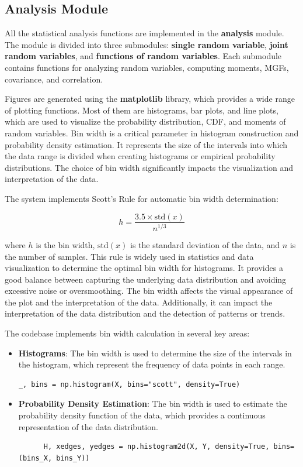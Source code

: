 \documentclass{article}
\begin{document}
\subsection{Analysis Module}

All the statistical analysis functions are implemented in the \textbf{analysis} module. The module is divided into three submodules: \textbf{single random variable}, \textbf{joint random variables}, and \textbf{functions of random variables}. Each submodule contains functions for analyzing random variables, computing moments, MGFs, covariance, and correlation.

Figures are generated using the \textbf{matplotlib} library, which provides a wide range of plotting functions. Most of them are histograms, bar plots, and line plots, which are used to visualize the probability distribution, CDF, and moments of random variables. Bin width is a critical parameter in histogram construction and probability density estimation. It represents the size of the intervals into which the data range is divided when creating histograms or empirical probability distributions. The choice of bin width significantly impacts the visualization and interpretation of the data.

The system implements Scott's Rule for automatic bin width determination:

\begin{equation}
  h = \frac{3.5 \times \text{std}(x)}{n^{1/3}}
\end{equation}

where $h$ is the bin width, $\text{std}(x)$ is the standard deviation of the data, and $n$ is the number of samples. This rule is widely used in statistics and data visualization to determine the optimal bin width for histograms. It provides a good balance between capturing the underlying data distribution and avoiding excessive noise or oversmoothing. The bin width  affects the visual appearance of the plot and the interpretation of the data. Additionally, it can impact the interpretation of the data distribution and the detection of patterns or trends.

The codebase implements bin width calculation in several key areas:

\begin{itemize}
  \item \textbf{Histograms}: The bin width is used to determine the size of the intervals in the histogram, which represent the frequency of data points in each range.
    \begin{verbatim}
_, bins = np.histogram(X, bins="scott", density=True)
    \end{verbatim}
  \item \textbf{Probability Density Estimation}: The bin width is used to estimate the probability density function of the data, which provides a continuous representation of the data distribution.
    \begin{verbatim}
      H, xedges, yedges = np.histogram2d(X, Y, density=True, bins=(bins_X, bins_Y))
    \end{verbatim}
\end{itemize}
\end{document}
